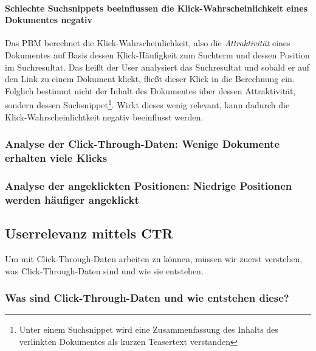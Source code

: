 \paragraph{Schlechte Suchsnippets beeinflussen die Klick-Wahrscheinlichkeit eines Dokumentes negativ}
Das PBM berechnet die Klick-Wahrscheinlichkeit, also die \textit{Attraktivität} eines Dokumentes auf Basis dessen Klick-Häufigkeit zum Suchterm und dessen Position im Suchresultat. Das heißt der User analysiert das Suchresultat und sobald er auf den Link zu einem Dokument klickt, fließt dieser Klick in die Berechnung ein. Folglich bestimmt nicht der Inhalt des Dokumentes über dessen Attraktivität, sondern dessen Suchsnippet\footnote{Unter einem Suchsnippet wird eine Zusammenfassung des Inhalts des verlinkten Dokumentes als kurzen Teasertext verstanden}. Wirkt dieses wenig relevant, kann dadurch die Klick-Wahrscheinlichtkeit negativ beeinflusst werden.

\subsubsection{Analyse der Click-Through-Daten: Wenige Dokumente erhalten viele Klicks}
\label{sec:Grundlagen:Grundbegriffe:SemantikUserInteraktionen:DocumentAttraction}



\subsubsection{Analyse der angeklickten Positionen: Niedrige Positionen werden häufiger angeklickt}
\label{sec:Grundlagen:Grundbegriffe:SemantikUserInteraktionen:RankExamination}




\subsection{Userrelevanz mittels CTR}
\label{sec:Grundlagen:Grundbegriffe:Click-Through-Daten}

Um mit Click-Through-Daten arbeiten zu können, müssen wir zuerst verstehen, was Click-Through-Daten sind und wie sie entstehen. 

\subsubsection{Was sind Click-Through-Daten und wie entstehen diese?}
\label{sec:Grundlagen:Grundbegriffe:Click-Through-Daten:WasSindClick-Through-Daten}

